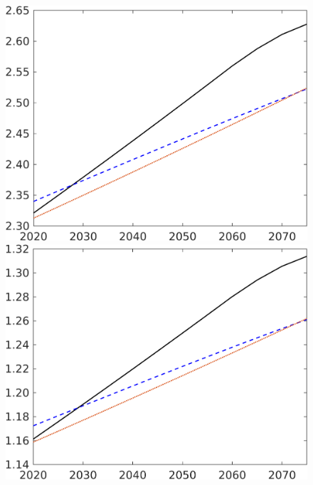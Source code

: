 \begin{figure}[h!!]
\begin{minipage}[]{0.32\textwidth}
	\end{minipage}
	\begin{minipage}[]{0.32\textwidth}
		\includegraphics[width=1\textwidth]{../../codding_model/own_basedOnFried/optimalPol_elastS_DisuSci/figures/all_1705/Y_CompEffOPT_NOT_NoTaus_spillover0_noskill1_sep1_BN0_ineq0_red0_etaa0.79_lgd0.png}
	\end{minipage}
	\begin{minipage}[]{0.32\textwidth}
		\includegraphics[width=1\textwidth]{../../codding_model/own_basedOnFried/optimalPol_elastS_DisuSci/figures/all_1705/E_CompEffOPT_NOT_NoTaus_spillover0_noskill1_sep1_BN0_ineq0_red0_etaa0.79_lgd0.png}

\end{minipage}
\end{figure}
